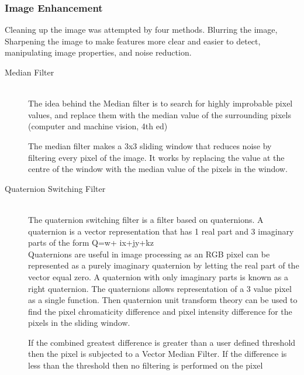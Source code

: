 \subsubsection{Image Enhancement}
Cleaning up the image was attempted by four methods. Blurring the image, Sharpening the image to make features more clear and easier to detect, manipulating image properties, and noise reduction. 
\begin{description}
\item[Median Filter]\hfill \\The idea behind the Median filter is to search for highly improbable pixel values, and replace them with the median value of the surrounding pixels (computer and machine vision, 4th ed)

The median filter makes a 3x3 sliding window that reduces noise by filtering every pixel of the image. It works by replacing the value at the centre of the window with the median value of the pixels in the window.

\item[Quaternion Switching Filter]\hfill \\
The quaternion switching filter \cite{web:QNSF} is a filter based on quaternions.
A quaternion is a vector representation that has 1 real part and 3 imaginary parts of the form 
Q=w+ ix+jy+kz \cite{article:Hamilton1844}
\\Quaternions are useful in image processing as an RGB pixel can be represented as a purely imaginary quaternion by letting the real part of the vector equal zero. A quaternion with only imaginary parts is known as a right quaternion.\cite{article:Hamilton1866}
The quaternions allows representation of a 3 value pixel as a single function. Then quaternion unit transform theory can be used to find the pixel chromaticity difference and pixel intensity difference for the pixels in the sliding window.

If the combined greatest difference is greater than a user defined threshold then the pixel is subjected to a Vector Median Filter. If the difference is less than the threshold then no filtering is performed on the pixel
\end{description}
 
